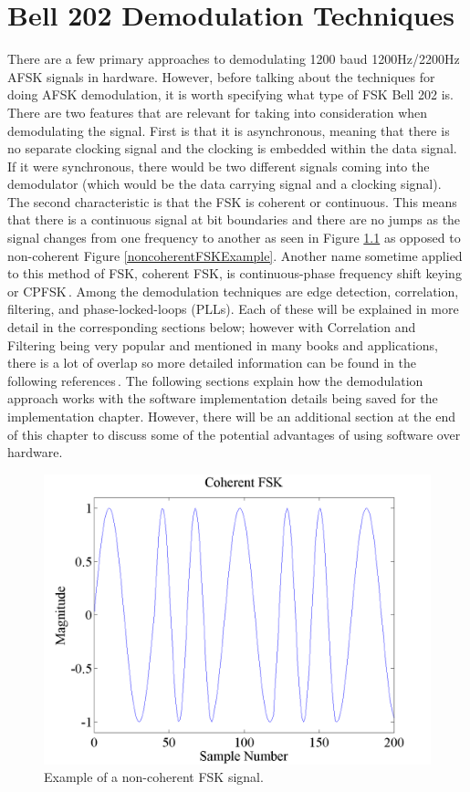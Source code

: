 \chapter{Bell 202 Demodulation Techniques}
There are a few primary approaches to demodulating 1200 baud 1200Hz/2200Hz AFSK signals in hardware.  However, before talking about the techniques for doing AFSK demodulation, it is worth specifying what type of FSK Bell 202 is. There are two features that are relevant for taking into consideration when demodulating the signal. First is that it is asynchronous, meaning that there is no separate clocking signal and the clocking is embedded within the data signal. If it were synchronous, there would be two different signals coming into the demodulator (which would be the data carrying signal and a clocking signal). The second characteristic is that the FSK is coherent or continuous. This means that there is a continuous signal at bit boundaries and there are no jumps as the signal changes from one frequency to another as seen in Figure \ref{coherentFSKExample} as opposed to non-coherent Figure \ref{noncoherentFSKExample}. Another name sometime applied to this method of FSK, coherent FSK, is continuous-phase frequency shift keying or CPFSK\,\cite{WikipediaCPFSK}. Among the demodulation techniques are edge detection, correlation, filtering, and phase-locked-loops (PLLs). Each of these will be explained in more detail in the corresponding sections below; however with Correlation and Filtering being very popular and mentioned in many books and applications, there is a lot of overlap so more detailed information can be found in the following references\,\cite{MarvinK.Simon1995,Sklar1988,J.Das1986,Proakis1983,Seguine2006,Semiconductor}. The following sections explain how the demodulation approach works with the software implementation details being saved for the implementation chapter. However, there will be an additional section at the end of this chapter to discuss some of the potential advantages of using software over hardware.
\begin{figure}
  \centering
	\includegraphics[width=0.75\linewidth]{images/CoherentFSK.png} 
	\caption{Example of a non-coherent FSK signal.}
   \label{coherentFSKExample}
\end{figure}
